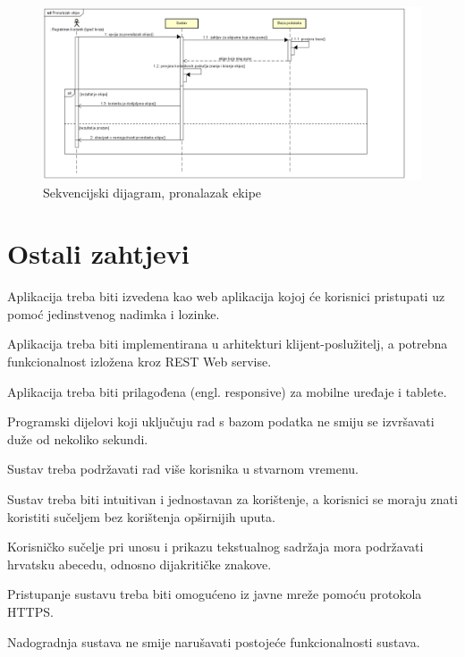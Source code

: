 				\begin{figure}[H]
					\includegraphics[width=\textwidth]{dijagrami/SeqDiagram3.PNG} 
					\caption{Sekvencijski dijagram, pronalazak ekipe}
					\label{fig:SeqDiagram3}
				\end{figure}
				
				\eject

	
		\section{Ostali zahtjevi}

			
		 	\begin{packed_item}
			 		
				 \item Aplikacija treba biti izvedena kao web aplikacija kojoj će korisnici pristupati
				 uz pomoć jedinstvenog nadimka i lozinke.
				 
				 \item Aplikacija treba biti implementirana u arhitekturi klijent-poslužitelj, a potrebna funkcionalnost izložena kroz
				 REST Web servise.
				 
 				 \item Aplikacija treba biti prilagođena (engl. responsive) za mobilne uređaje i tablete.
				 
				 \item Programski dijelovi koji uključuju rad s bazom podatka ne smiju se izvršavati duže od nekoliko sekundi.
				 
				 \item Sustav treba podržavati rad više korisnika u stvarnom vremenu.
				 
				 \item Sustav treba biti intuitivan i jednostavan za korištenje, a korisnici se moraju znati koristiti sučeljem bez korištenja opširnijih uputa.
				 
				 \item Korisničko sučelje pri unosu i prikazu tekstualnog sadržaja mora podržavati hrvatsku abecedu, odnosno dijakritičke znakove.
				 
				 \item Pristupanje sustavu treba biti omogućeno iz javne mreže pomoću protokola HTTPS.
				 
 				 \item Nadogradnja sustava ne smije narušavati postojeće funkcionalnosti sustava.

			
			\end{packed_item}			 
			 
			 
	